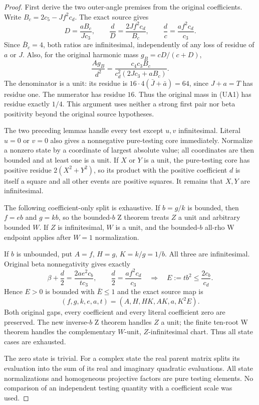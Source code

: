 \begin{proof}
First derive the two outer-angle premises from the original coefficients.
Write $B_c=2c_5-Jf^2c_d$. The exact source gives
\[
 D=\frac{aB_c}{Jc_3},\qquad
 \frac dD=\frac{2Jf^2c_d}{B_c},\qquad
 \frac dc=\frac{af^2c_d}{c_3}.
\]
Since $\bar B_c=4$, both ratios are infinitesimal, independently of
any loss of residue of $a$ or $J$. Also, for the original harmonic
mass $g_B=cD/(c+D)$,
\[
 \frac{A g_B}{d^2}
 =\frac{c_4c_3B_c}{c_d^2(2Jc_3+aB_c)}.              \tag{UA1}
\]
The denominator is a unit: its residue is
$16\cdot4(\bar J+\bar a)=64$, since $J+a=T$ has residue one.
The numerator has residue $16$. Thus the original mass in (UA1) has
residue exactly $1/4$. This argument uses neither a strong first pair
nor beta positivity beyond the original source hypotheses.

The two preceding lemmas handle every test except $u,v$ infinitesimal.
Literal $u=0$ or $v=0$ also gives a nonnegative pure-testing core
immediately. Normalize a nonzero state by a coordinate of largest
absolute value; all coordinates are then bounded and at least one is
a unit. If $X$ or $Y$ is a unit, the pure-testing core has positive
residue $2(X^2+Y^2)$, so its product with the positive coefficient $d$
is itself a square and all other events are positive squares.
It remains that $X,Y$ are infinitesimal.

The following coefficient-only split is exhaustive. If $b=g/k$ is
bounded, then $f=eb$ and $g=kb$, so the bounded-$b$ Z theorem treats
$Z$ a unit and arbitrary bounded $W$. If $Z$ is infinitesimal, $W$ is
a unit, and the bounded-$b$ all-rho W endpoint applies after $W=1$
normalization.

If $b$ is unbounded, put $A=f$, $H=g$, $K=k/g=1/b$.
All three are infinitesimal. Original beta nonnegativity gives exactly
\[
 \beta+\frac d2=\frac{2ae^2c_b}{tc_3},\qquad
 \frac d2=\frac{af^2c_d}{c_3}
 \quad\Longrightarrow\quad
 E:=tb^2\leq\frac{2c_b}{c_d}.
\]
Hence $E>0$ is bounded with $\bar E\leq1$ and the exact source map is
\[
 (f,g,k,e,a,t)=(A,H,HK,AK,a,K^2E).
\]
Both original gaps, every coefficient and every literal coefficient
zero are preserved. The new inverse-$b$ Z theorem handles $Z$ a unit;
the finite ten-root W theorem handles the complementary $W$-unit,
$Z$-infinitesimal chart. Thus all state cases are exhausted.

The zero state is trivial. For a complex state the real parent matrix
splits its evaluation into the sum of its real and imaginary quadratic
evaluations. All state normalizations and homogeneous projective factors
are pure testing elements. No comparison of an independent testing
quantity with a coefficient scale was used.
\end{proof}
